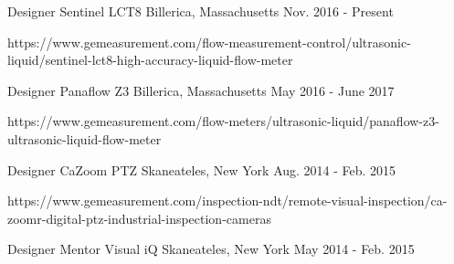 



\begin{cventries}
  \cventry
    {Designer} %
    {Sentinel LCT8} %
    {Billerica, Massachusetts} %
    {Nov. 2016 - Present} %
    {
      \begin{cvitems} %
        \item {https://www.gemeasurement.com/flow-measurement-control/ultrasonic-liquid/sentinel-lct8-high-accuracy-liquid-flow-meter}
      \end{cvitems}
    }
  \cventry
    {Designer} %
    {Panaflow Z3} %
    {Billerica, Massachusetts} %
    {May 2016 - June 2017} %
    {
      \begin{cvitems} %
        \item {https://www.gemeasurement.com/flow-meters/ultrasonic-liquid/panaflow-z3-ultrasonic-liquid-flow-meter}
      \end{cvitems}
    }
  \cventry
    {Designer} %
    {CaZoom PTZ} %
    {Skaneateles, New York} %
    {Aug. 2014 - Feb. 2015} %
    {
      \begin{cvitems} %
        \item {https://www.gemeasurement.com/inspection-ndt/remote-visual-inspection/ca-zoomr-digital-ptz-industrial-inspection-cameras}
      \end{cvitems}
    }
  \cventry
    {Designer} %
    {Mentor Visual iQ} %
    {Skaneateles, New York} %
    {May 2014 - Feb. 2015} %

\end{cventries}
